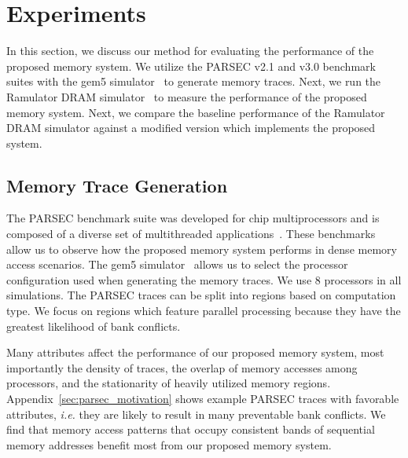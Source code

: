 \section{Experiments}
\label{sec:experimentalmethodology}

In this section, we discuss our method for evaluating the performance of the proposed memory system. We utilize the PARSEC v2.1 and v3.0 benchmark suites with the gem5 simulator~\cite{bienia09parsec2, parsec_2_1_m5} to generate memory traces. Next, we run the Ramulator DRAM simulator~\cite{Ramulator} to measure the performance of the proposed memory system. Next, we compare the baseline performance of the Ramulator DRAM simulator against a modified version which implements the proposed system.

\subsection{Memory Trace Generation}
The PARSEC benchmark suite was developed for chip multiprocessors and is composed of a diverse set of multithreaded applications~\cite{bienia09parsec2}. These benchmarks allow us to observe how the proposed memory system performs in dense memory access scenarios. 
%
The gem5 simulator~\cite{parsec_2_1_m5} allows us to select the processor configuration used when generating the memory traces. We use $8$ processors in all simulations. The PARSEC traces can be split into regions based on computation type. We focus on regions which feature parallel processing because they have the greatest likelihood of bank conflicts.
%

Many attributes affect the performance of our proposed memory system, most importantly the density of traces, the overlap of memory accesses among processors, and the stationarity of heavily utilized memory regions. Appendix~\ref{sec:parsec_motivation} shows example PARSEC traces with favorable attributes, \textit{i.e.} they are likely to result in many preventable bank conflicts. We find that memory access patterns that occupy consistent bands of sequential memory addresses benefit most from our proposed memory system.

